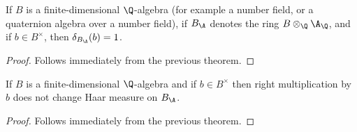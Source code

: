   \begin{corollary}
    \label{NumberField.AdeleRing.units_mem_ringHaarCharacter_ker}
    \leanok
    If $B$ is a finite-dimensional $\Q$-algebra (for example a number field, or a quaternion algebra over a number field),
    if $B_{\A}$ denotes the ring $B\otimes_{\Q}\A_{\Q}$, and if $b\in B^\times$,
    then $\delta_{B_{\A}}(b)=1$.
  \end{corollary}
  \begin{proof}
    \leanok
    Follows immediately from the previous theorem.
  \end{proof}

  \begin{corollary}
    \label{NumberField.AdeleRing.addEquivAddHaarChar_mulRight_unit_eq_one}
    \leanok
    If $B$ is a finite-dimensional $\Q$-algebra and
    if $b\in B^\times$ then right multiplication by $b$
    does not change Haar measure on $B_{\A}$.
  \end{corollary}
  \begin{proof}
    \leanok
    Follows immediately from the previous theorem.
  \end{proof}
